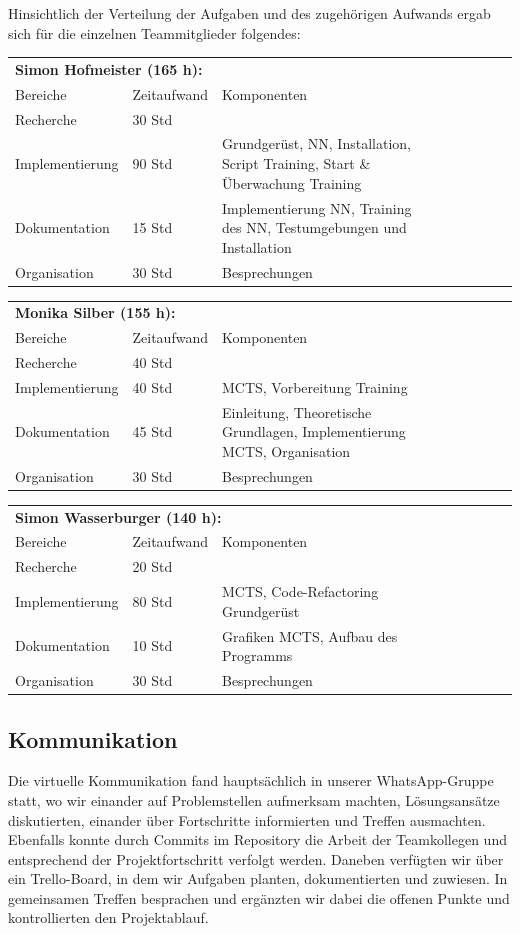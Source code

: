 \documentclass[12pt,a4paper]{article}
\begin{document}
Hinsichtlich der Verteilung der Aufgaben und des zugehörigen Aufwands ergab sich für die einzelnen Teammitglieder folgendes:

\begin{tabular}{*{3}{p{4cm}p{3cm}p{8cm}}}
\multicolumn{3}{l}{\textbf{Simon Hofmeister (165 h):}} \\
Bereiche & Zeitaufwand & Komponenten \\
\cline{1-3}
Recherche & 30 Std &  \\
Implementierung & 90 Std & Grundgerüst, NN, Installation, Script Training, Start \& Überwachung Training  \\
Dokumentation & 15 Std & Implementierung NN, Training des NN, Testumgebungen und Installation \\
Organisation & 30 Std &  Besprechungen\\
\end{tabular}


\begin{tabular}{*{3}{p{4cm}p{3cm}p{8cm}}}
\multicolumn{3}{l}{\textbf{Monika Silber (155 h):}} \\
Bereiche & Zeitaufwand & Komponenten \\
\cline{1-3}
Recherche & 40 Std &  \\
Implementierung & 40 Std & MCTS, Vorbereitung Training  \\
Dokumentation & 45 Std &  Einleitung, Theoretische Grundlagen, Implementierung MCTS, Organisation \\
Organisation & 30 Std &  Besprechungen\\
\end{tabular}


\begin{tabular}{*{3}{p{4cm}p{3cm}p{8cm}}}
\multicolumn{3}{l}{\textbf{Simon Wasserburger (140 h):}} \\
Bereiche & Zeitaufwand & Komponenten \\
\cline{1-3}
Recherche & 20 Std &  \\
Implementierung & 80 Std & MCTS, Code-Refactoring Grundgerüst  \\
Dokumentation & 10 Std &  Grafiken MCTS, Aufbau des Programms \\
Organisation & 30 Std &  Besprechungen\\
\end{tabular}

\subsection{Kommunikation}
Die virtuelle Kommunikation fand hauptsächlich in unserer WhatsApp-Gruppe statt, wo wir einander auf Problemstellen aufmerksam machten, Lösungsansätze diskutierten, einander über Fortschritte informierten und Treffen ausmachten. Ebenfalls konnte durch Commits im Repository die Arbeit der Teamkollegen und entsprechend der Projektfortschritt verfolgt werden. Daneben verfügten wir über ein Trello-Board, in dem wir Aufgaben planten, dokumentierten und zuwiesen. In gemeinsamen Treffen besprachen und ergänzten wir dabei die offenen Punkte und kontrollierten den Projektablauf. 
\end{document}
